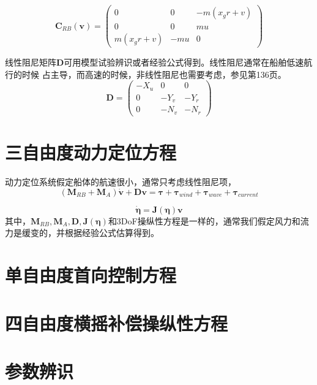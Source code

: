 \begin{equation}
  \label{eq:coupleddampingmatrix}
  \bm{C}_{RB}(\bm{v})=
         \begin{pmatrix}
            0 & 0 & -m(x_g r +v) \\
            0 & 0 & mu \\
            m(x_g r +v) & -mu & 0
          \end{pmatrix}
\end{equation}

线性阻尼矩阵$\bm{D}$可用模型试验辨识或者经验公式得到。线性阻尼通常在船舶低速航行的时候
占主导，而高速的时候，非线性阻尼也需要考虑，参见\cite{fossen2011handbook}第136页。
\begin{equation}
  \label{eq:lineardampingmatrix}
  \bm{D}=\begin{pmatrix}
            -X_{u} & 0 & 0 \\
            0 & -Y_{v} & -Y_r \\
            0 & -N_v & -N_r
          \end{pmatrix}
\end{equation}


\section{三自由度动力定位方程}
动力定位系统假定船体的航速很小，通常只考虑线性阻尼项，
\begin{equation}
  \label{eq:3dofdp}
  (\bm{M}_{RB}+\bm{M}_A) \dot{\bm{v}}+\bm{D}\bm{v}=\bm{\tau}+\bm{\tau}_{wind}+
  \bm{\tau}_{wave}+\bm{\tau}_{current}
\end{equation}

\begin{equation}
  \label{eq:3doftransformdp}
  \dot{\bm{\eta}}=\bm{J}(\bm{\eta})\bm{v}
\end{equation}
其中，$\bm{M}_{RB},\bm{M}_A, \bm{D}, \bm{J}(\bm{\eta})$和3DoF操纵性方程是一样的，通常我们假定风力和流力是缓变的，并根据经验公式估算得到。
\section{单自由度首向控制方程}




\section{四自由度横摇补偿操纵性方程}


\section{参数辨识}

